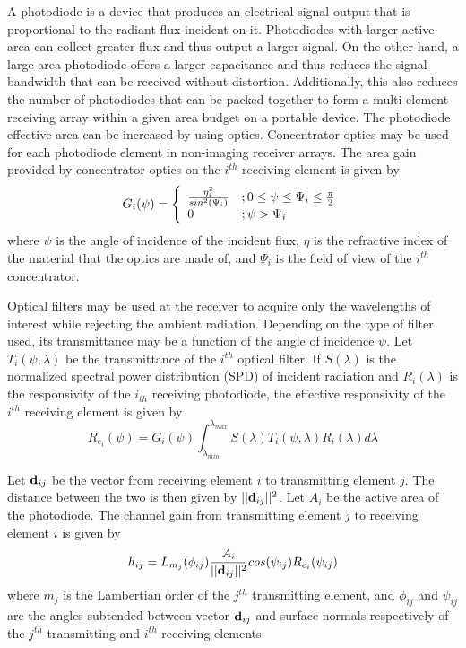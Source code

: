 A photodiode is a device that produces an electrical signal output that is proportional to the radiant flux incident on it. Photodiodes with larger active area can collect greater flux and thus output a larger signal. On the other hand, a large area photodiode offers a larger capacitance and thus reduces the signal bandwidth that can be received without distortion. Additionally, this also reduces the number of photodiodes that can be packed together to form a multi-element receiving array within a given area budget on a portable device. The photodiode effective area can be increased by using optics. Concentrator optics may be used for each photodiode element in non-imaging receiver arrays. The area gain provided by concentrator optics on the $i^{th}$ receiving element is given by
\begin{equation}
	\label{eqGain}
	G_i(\psi) = \twopartdef{\frac{\eta_i^2}{sin^2(\Psi_{i})}} {0\leq\psi\leq\Psi_{i}\leq\frac{\pi}{2}}{0}{\psi>\Psi_{i}}
\end{equation}
where $\psi$ is the angle of incidence of the incident flux, $\eta$ is the refractive index of the material that the optics are made of, and $\Psi_i$ is the field of view of the $i^{th}$ concentrator.

Optical filters may be used at the receiver to acquire only the wavelengths of interest while rejecting the ambient radiation. Depending on the type of filter used, its transmittance may be a function of the angle of incidence $\psi$. Let $T_i(\psi,\lambda)$ be the transmittance of the $i^{th}$ optical filter. If $S(\lambda)$ is the normalized spectral power distribution (SPD) of incident radiation and $R_i(\lambda)$ is the responsivity of the $i_{th}$ receiving photodiode, the effective responsivity of the $i^{th}$ receiving element is given by
\begin{equation}
	\label{eqReff}
	R_{e_i}(\psi) = G_i(\psi)\int^{\lambda_{max}}_{\lambda_{min}}S(\lambda)T_i(\psi,\lambda)R_i(\lambda)d\lambda
\end{equation}

Let ${\bf{d}}_{ij}$ be the vector from receiving element $i$ to transmitting element $j$. The distance between the two is then given by $||{\bf{d}}_{ij}||^2$. Let $A_i$ be the active area of the photodiode. The channel gain from transmitting element $j$ to receiving element $i$ is given by
\begin{equation}
	\label{eqChGain}
	h_{ij} = L_{m_j}(\phi_{ij})\frac{A_i}{||\vm{d}_{ij}||^{2}}cos(\psi_{ij})R_{e_i}(\psi_{ij})
\end{equation}
where $m_j$ is the Lambertian order of the $j^{th}$ transmitting element, and $\phi_{ij}$ and $\psi_{ij}$ are the angles subtended between vector ${\bf{d}}_{ij}$ and surface normals respectively of the $j^{th}$ transmitting and $i^{th}$ receiving elements.

